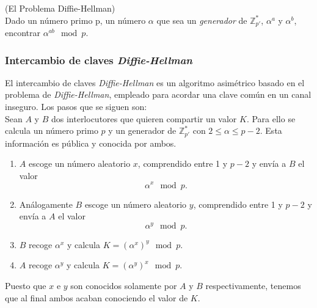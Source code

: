 
\begin{definicion}
	(El Problema Diffie-Hellman)\\ Dado un número primo p, un número $\alpha$ que sea un \emph{generador} de $\mathbb{Z}^*_{p'}$, $\alpha^a$ y $\alpha^b$, encontrar $\alpha^{ab} \mod p$.  
\end{definicion}

\subsubsection{Intercambio de claves \emph{Diffie-Hellman}}
El intercambio de claves \emph{Diffie-Hellman} es un algoritmo asimétrico basado en el problema de \emph{Diffie-Hellman}, empleado para acordar una clave común en un canal inseguro. Los pasos que se siguen son:\\
Sean $A$ y $B$ dos interlocutores que quieren compartir un valor $K$. Para ello se calcula un número primo $p$ y un generador \alpha de $\mathbb{Z}^*_{p'}$ con $2\leq \alpha \leq p-2$. Esta información es pública y conocida por ambos.
\begin{enumerate}
	\item $A$ escoge un número aleatorio $x$, comprendido entre 1 y $p-2$ y envía a $B$ el valor 
		$$
			\alpha^x \mod p.
		$$
	\item Análogamente $B$ escoge un número aleatorio $y$, comprendido entre 1 y $p-2$ y envía a $A$ el valor 
		$$
			\alpha^y \mod p.
		$$

	\item $B$ recoge $\alpha^x$ y calcula $K=(\alpha^x)^y \mod p$.
	\item $A$ recoge $\alpha^y$ y calcula $K=(\alpha^y)^x \mod p$.
\end{enumerate}
Puesto que $x$ e $y$ son conocidos solamente por $A$ y $B$ respectivamente, tenemos que al final ambos acaban conociendo el valor de $K$.\\


